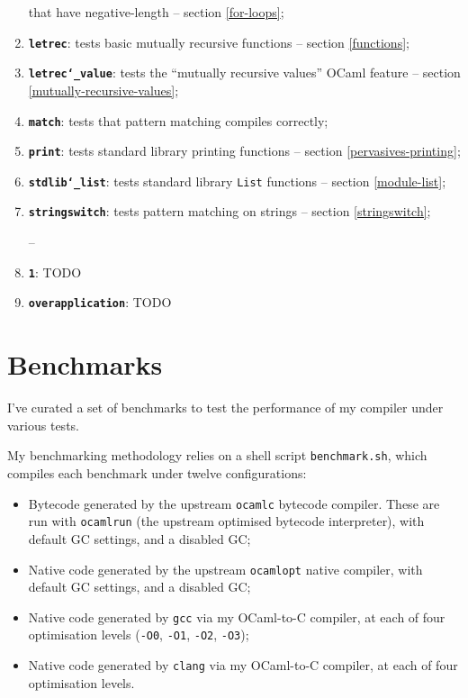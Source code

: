 \documentclass[12pt,a4paper,twoside,openright]{report}
\begin{document}
\begin{enumerate}
        that have negative-length -- section \ref{for-loops};
    \item \textbf{\texttt{letrec}}: tests basic mutually recursive functions --
        section \ref{functions};
    \item \textbf{\texttt{letrec\char`_value}}: tests the ``mutually recursive
        values'' OCaml feature -- section \ref{mutually-recursive-values};
    \item \textbf{\texttt{match}}: tests that pattern matching compiles
        correctly;
    \item \textbf{\texttt{print}}: tests standard library printing functions --
        section \ref{pervasives-printing};
    \item \textbf{\texttt{stdlib\char`_list}}: tests standard library
        \lstinline!List! functions -- section \ref{module-list};
    \item \textbf{\texttt{stringswitch}}: tests pattern matching on strings --
        section \ref{stringswitch};

--

    \item \textbf{\texttt{1}}: TODO
    \item \textbf{\texttt{overapplication}}: TODO
\end{enumerate}

\section{Benchmarks}\label{benchmarks}

I've curated a set of benchmarks to test the performance of my compiler under
various tests.

My benchmarking methodology relies on a shell script \lstinline!benchmark.sh!,
which compiles each benchmark under twelve configurations:
\begin{itemize}
    \item Bytecode generated by the upstream \lstinline!ocamlc! bytecode compiler. These are run with \lstinline!ocamlrun! (the upstream optimised bytecode interpreter), with default GC settings, and a disabled GC;
    \item Native code generated by the upstream \lstinline!ocamlopt! native compiler, with default GC settings, and a disabled GC;
    \item Native code generated by \lstinline!gcc! via my OCaml-to-C compiler, at each of four optimisation levels (\lstinline!-O0!, \lstinline!-O1!, \lstinline!-O2!, \lstinline!-O3!);
    \item Native code generated by \lstinline!clang! via my OCaml-to-C compiler, at each of four optimisation levels.
\end{itemize}
\end{document}
